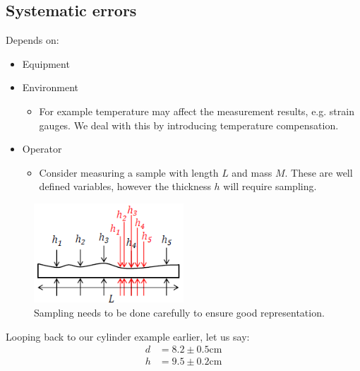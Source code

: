 \documentclass[class=report, crop=false, 12pt,a4paper]{standalone}
\begin{document}
\subsection{Systematic errors}
Depends on:
\begin{itemize}
  \item Equipment
  \item Environment
    \begin{itemize}
      \item For example temperature may affect the measurement results, e.g. strain gauges. We deal with this by introducing temperature compensation.
    \end{itemize}
  \item Operator
    \begin{itemize}
      \item Consider measuring a sample with length $L$ and mass $M$. These are well defined variables, however the thickness $h$ will require sampling.
    \end{itemize}
\end{itemize}
\begin{figure}[H]
  \centering
  \includegraphics[width = 0.5\textwidth]{../img/diagram63.png}
  \caption{Sampling needs to be done carefully to ensure good representation.}
\end{figure}
Looping back to our cylinder example earlier, let us say:
\begin{align}
  d &= 8.2 \pm 0.5 \si{\centi\meter}\\
  h &= 9.5 \pm 0.2 \si{\centi\meter}
\end{align}
\end{document}
